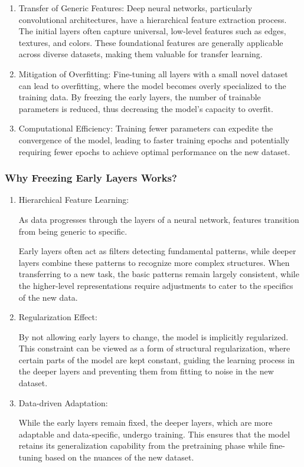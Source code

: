 \documentclass{article}
\begin{document}
\begin{enumerate}
\item Transfer of Generic Features: Deep neural networks, particularly convolutional architectures, have a hierarchical feature extraction process. The initial layers often capture universal, low-level features such as edges, textures, and colors. These foundational features are generally applicable across diverse datasets, making them valuable for transfer learning.

\item Mitigation of Overfitting: Fine-tuning all layers with a small novel dataset can lead to overfitting, where the model becomes overly specialized to the training data. By freezing the early layers, the number of trainable parameters is reduced, thus decreasing the model's capacity to overfit.

\item Computational Efficiency: Training fewer parameters can expedite the convergence of the model, leading to faster training epochs and potentially requiring fewer epochs to achieve optimal performance on the new dataset.
\end{enumerate}

\subsubsection{Why Freezing Early Layers Works?}
\begin{enumerate}
  \item Hierarchical Feature Learning: 
  
  As data progresses through the layers of a neural network, features transition from being generic to specific. 

Early layers often act as filters detecting fundamental patterns, while deeper layers combine these patterns to recognize more complex structures. 
When transferring to a new task, the basic patterns remain largely consistent, while the higher-level representations require adjustments to cater to the specifics of the new data.

\item Regularization Effect: 

By not allowing early layers to change, the model is implicitly regularized. This constraint can be viewed as a form of structural regularization, where certain parts of the model are kept constant, guiding the learning process in the deeper layers and preventing them from fitting to noise in the new dataset.

\item Data-driven Adaptation: 

While the early layers remain fixed, the deeper layers, which are more adaptable and data-specific, undergo training. This ensures that the model retains its generalization capability from the pretraining phase while fine-tuning based on the nuances of the new dataset.
\end{enumerate}
\end{document}
